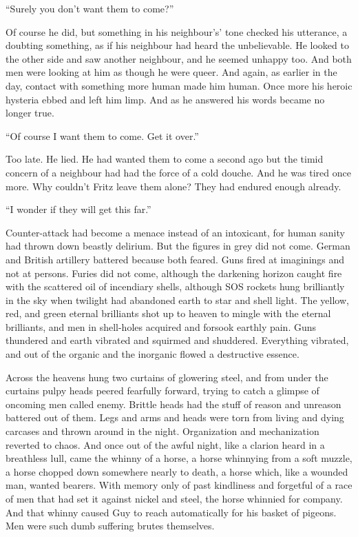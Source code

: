 ``Surely you don't want them to come?''

Of course he did, but something in his neighbour's' tone checked his utterance, a doubting something, as if his neighbour had heard the unbelievable. He looked to the other side and saw another neighbour, and he seemed unhappy too. And both men were looking at him as though he were queer. And again, as earlier in the day, contact with something more human made him human. Once more his heroic hysteria ebbed and left him limp. And as he answered his words became no longer true.

``Of course I want them to come. Get it over.''

Too late. He lied. He had wanted them to come a second ago but the timid concern of a neighbour had had the force of a cold douche. And he was tired once more. Why couldn't Fritz leave them alone? They had endured enough already.

``I wonder if they will get this far.''

Counter-attack had become a menace instead of an intoxicant, for human sanity had thrown down beastly delirium. But the figures in grey did not come. German and British artillery battered because both feared. Guns fired at imaginings and not at persons. Furies did not come, although the darkening horizon caught fire with the scattered oil of incendiary shells, although SOS rockets hung brilliantly in the sky when twilight had abandoned earth to star and shell light. The yellow, red, and green eternal brilliants shot up to heaven to mingle with the eternal brilliants, and men in shell-holes acquired and forsook earthly pain. Guns thundered and earth vibrated and squirmed and shuddered. Everything vibrated, and out of the organic and the inorganic flowed a destructive essence.

Across the heavens hung two curtains of glowering steel, and from under the curtains pulpy heads peered fearfully forward, trying to catch a glimpse of oncoming men called enemy. Brittle heads had the stuff of reason and unreason battered out of them. Legs and arms and heads were torn from living and dying carcases and thrown around in the night. Organization and mechanization reverted to chaos. And once out of the awful night, like a clarion heard in a breathless lull, came the whinny of a horse, a horse whinnying from a soft muzzle, a horse chopped down somewhere nearly to death, a horse which, like a wounded man, wanted bearers. With memory only of past kindliness and forgetful of a race of men that had set it against nickel and steel, the horse whinnied for company. And that whinny caused Guy to reach automatically for his basket of pigeons. Men were such dumb suffering brutes themselves.

